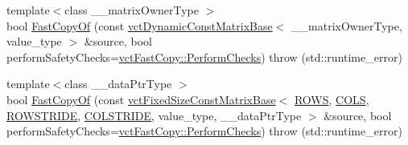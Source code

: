 {\bf }\par
\begin{DoxyCompactItemize}
\item 
{\footnotesize template$<$class \+\_\+\+\_\+matrix\+Owner\+Type $>$ }\\bool \hyperlink{classvct_fixed_size_matrix_base_af4b2a36b4660978a7bf76203f4f57b12}{Fast\+Copy\+Of} (const \hyperlink{classvct_dynamic_const_matrix_base}{vct\+Dynamic\+Const\+Matrix\+Base}$<$ \+\_\+\+\_\+matrix\+Owner\+Type, value\+\_\+type $>$ \&source, bool perform\+Safety\+Checks=\hyperlink{classvct_fast_copy_af2981ae09904d1a4dd9b2d19c86c6cd9}{vct\+Fast\+Copy\+::\+Perform\+Checks})  throw (std\+::runtime\+\_\+error)
\item 
{\footnotesize template$<$class \+\_\+\+\_\+data\+Ptr\+Type $>$ }\\bool \hyperlink{classvct_fixed_size_matrix_base_af61629d8b0fb88f8782bd8f82b2db81d}{Fast\+Copy\+Of} (const \hyperlink{classvct_fixed_size_const_matrix_base}{vct\+Fixed\+Size\+Const\+Matrix\+Base}$<$ \hyperlink{classvct_fixed_size_matrix_base_a939e2f4b06ffc96c2d9d9a27dcb9fa33ab17b61dd0080412b3f116710fdfcc928}{R\+O\+W\+S}, \hyperlink{classvct_fixed_size_matrix_base_a939e2f4b06ffc96c2d9d9a27dcb9fa33a977a8d137c1cd687cca56aaea7ecf08c}{C\+O\+L\+S}, \hyperlink{classvct_fixed_size_matrix_base_a7ca4cc289d4bd697476f2d37e82e9a38a6c561939f5de9c5e815b889df7662117}{R\+O\+W\+S\+T\+R\+I\+D\+E}, \hyperlink{classvct_fixed_size_matrix_base_a7ca4cc289d4bd697476f2d37e82e9a38a920a67cbcd917bab0e46677bf43cb6b8}{C\+O\+L\+S\+T\+R\+I\+D\+E}, value\+\_\+type, \+\_\+\+\_\+data\+Ptr\+Type $>$ \&source, bool perform\+Safety\+Checks=\hyperlink{classvct_fast_copy_af2981ae09904d1a4dd9b2d19c86c6cd9}{vct\+Fast\+Copy\+::\+Perform\+Checks})  throw (std\+::runtime\+\_\+error)
\end{DoxyCompactItemize}

